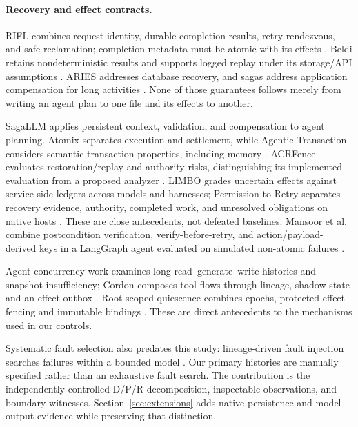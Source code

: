 \documentclass[10pt,letterpaper]{article}
\begin{document}
\paragraph{Recovery and effect contracts.}
RIFL combines request identity, durable completion results, retry rendezvous, and safe reclamation; completion metadata must be atomic with its effects \cite{lee2015implementing}. Beldi retains nondeterministic results and supports logged replay under its storage/API assumptions \cite{zhang2020fault}. ARIES addresses database recovery, and sagas address application compensation for long activities \cite{mohan1992aries,garciamolina1987sagas}. None of those guarantees follows merely from writing an agent plan to one file and its effects to another.

SagaLLM applies persistent context, validation, and compensation to agent planning. Atomix separates execution and settlement, while Agentic Transaction considers semantic transaction properties, including memory \cite{chang2025sagallm,mohammadi2026atomix,sun2026agentic}. ACRFence evaluates restoration/replay and authority risks, distinguishing its implemented evaluation from a proposed analyzer \cite{zheng2026acrfence}. LIMBO grades uncertain effects against service-side ledgers across models and harnesses; Permission to Retry separates recovery evidence, authority, completed work, and unresolved obligations on native hosts \cite{li2026where,marla2026permission}. These are close antecedents, not defeated baselines. Mansoor et al. combine postcondition verification, verify-before-retry, and action/payload-derived keys in a LangGraph agent evaluated on simulated non-atomic failures \cite{mansoor2026verified}.

Agent-concurrency work examines long read--generate--write histories and snapshot insufficiency; Cordon composes tool flows through lineage, shadow state and an effect outbox \cite{khan2026concurrency,chen2026cordon}. Root-scoped quiescence combines epochs, protected-effect fencing and immutable bindings \cite{zhu2026quiescence}. These are direct antecedents to the mechanisms used in our controls.

Systematic fault selection also predates this study: lineage-driven fault injection searches failures within a bounded model \cite{alvaro2015lineage}. Our primary histories are manually specified rather than an exhaustive fault search. The contribution is the independently controlled D/P/R decomposition, inspectable observations, and boundary witnesses. Section~\ref{sec:extensions} adds native persistence and model-output evidence while preserving that distinction.
\end{document}
